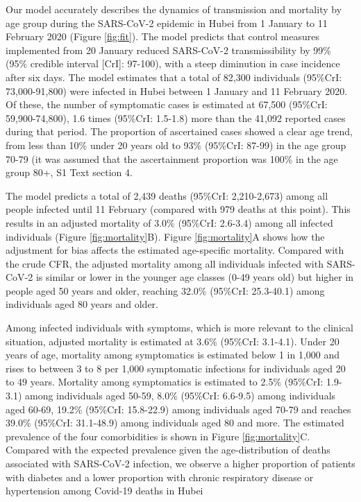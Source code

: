 \documentclass{article}
\begin{document}
Our model accurately describes the dynamics of transmission and mortality by age group during the SARS-CoV-2 epidemic in Hubei from 1 January to 11 February 2020 (Figure \ref{fig:fit}).
The model predicts that control measures implemented from 20 January reduced SARS-CoV-2 transmissibility by 99\% (95\% credible interval [CrI]: 97-100), with a steep diminution in case incidence after six days. 
The model estimates that a total of 82,300 individuals (95\%CrI: 73,000-91,800) were infected in Hubei between 1 January and 11 February 2020.
Of these, the number of symptomatic cases is estimated at 67,500 (95\%CrI: 59,900-74,800), 1.6 times (95\%CrI: 1.5-1.8) more than the 41,092 reported cases during that period. 
The proportion of ascertained cases showed a clear age trend, from less than 10\% under 20 years old to 93\% (95\%CrI: 87-99) in the age group 70-79 (it was assumed that the ascertainment proportion was 100\% in the age group 80+, S1 Text section 4.

The model predicts a total of 2,439 deaths (95\%CrI: 2,210-2,673) among all people infected until 11 February (compared with 979 deaths at this point).
This results in an adjusted mortality of 3.0\% (95\%CrI: 2.6-3.4) among all infected individuals (Figure \ref{fig:mortality}B).
Figure \ref{fig:mortality}A shows how the adjustment for bias affects the estimated age-specific mortality. 
Compared with the crude CFR, the adjusted mortality among all individuals infected with SARS-CoV-2 is similar or lower in the younger age classes (0-49 years old) but higher in people aged 50 years and older, reaching 32.0\% (95\%CrI: 25.3-40.1) among individuals aged 80 years and older.

Among infected individuals with symptoms, which is more relevant to the clinical situation, adjusted mortality is estimated at 3.6\% (95\%CrI: 3.1-4.1). 
Under 20 years of age, mortality among symptomatics is estimated below 1 in 1,000 and rises to between 3 to 8 per 1,000 symptomatic infections for individuals aged 20 to 49 years. 
Mortality among symptomatics is estimated to 2.5\% (95\%CrI: 1.9-3.1) among individuals aged 50-59, 8.0\% (95\%CrI: 6.6-9.5) among individuals aged 60-69, 19.2\% (95\%CrI: 15.8-22.9) among individuals aged 70-79 and reaches 39.0\% (95\%CrI: 31.1-48.9) among individuals aged 80 and more. 
The estimated prevalence of the four comorbidities is shown in Figure \ref{fig:mortality}C. 
Compared with the expected prevalence given the age-distribution of deaths associated with SARS-CoV-2 infection, we observe a higher proportion of patients with diabetes and a lower proportion with chronic respiratory disease or hypertension among Covid-19 deaths in Hubei
\end{document}
